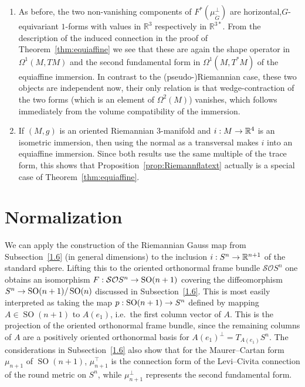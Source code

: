 \documentclass[AHL,Unicode,longabstracts]{cedram}
\newcommand{\Om}{\Omega}
\DeclareMathOperator{\SO}{SO}
\newcommand*{\R}{\mathbb{R}}
\newcommand{\clSO}{\mathcal{SO}}
\renewcommand*{\to}{\mathchoice{\longrightarrow}{\rightarrow}{\rightarrow}{\rightarrow}}
\newcommand*{\R}{\mathbb{R}}
\begin{document}
\begin{rema}\label{rem:equi-aff}\leavevmode
\begin{enumerate}
\item\label{rema6.11.1} As before, the two non-vanishing components of $F^*(\mu_{\widetilde G}^\perp)$ are horizontal,\linebreak $G$-equivariant $1$-forms with values in $\R^3$ respectively in $\R^{3*}$. From the description of the induced connection in the proof of Theorem~\ref{thm:equiaffine} we see that these are again the shape operator in $\Om^1(M,TM)$ and the second fundamental form in $\Om^1(M,T^*M)$ of the equiaffine immersion. In contrast to the (pseudo-)\linebreak Riemannian case, these two objects are independent now, their only relation is that wedge-contraction of the two forms (which is an element of $\Om^2(M)$) vanishes, which follows immediately from the volume compatibility of the immersion.

\item\label{rema6.11.2} If $(M,g)$ is an oriented Riemannian $3$-manifold and $i:M\to\R^4$ is an isometric immersion, then using the normal as a transversal makes $i$ into an equiaffine immersion. Since both results use the same multiple of the trace form, this shows that Proposition~\ref{prop:Riemannflatext} actually is a special case of Theorem~\ref{thm:equiaffine}.
\end{enumerate}
\end{rema}

\appendix

\section{Normalization}\label{Appendix}

We can apply the construction of the Riemannian Gauss map from Subsection~\ref{1.6} (in general dimensions) to the inclusion $i:S^n\to\R^{n+1}$ of the standard sphere. Lifting this to the oriented orthonormal frame bundle $\clSO S^n$ one obtains an isomorphism $F:\clSO S^n\to \SO(n+1)$ covering the diffeomorphism $S^n\to\SO(n+1)/\SO(n)$ discussed in Subsection~\ref{1.6}. This is most easily interpreted as taking the map $p:\SO(n+1)\to S^n$ defined by mapping $A\in\SO(n+1)$ to $A(e_1)$, i.e.~the first column vector of $A$. This is the projection of the oriented orthonormal frame bundle, since the remaining columns of $A$ are a positively oriented orthonormal basis for $A(e_1)^\perp=T_{A(e_1)}S^n$. The considerations in Subsection~\ref{1.6} also show that for the Maurer--Cartan form $\mu_{n+1}$ of $\SO(n+1)$, $\mu_{n+1}^\top$ is the connection form of the Levi--Civita connection of the round metric on $S^n$, while $\mu_{n+1}^\perp$ represents the second fundamental form.
\end{document}
